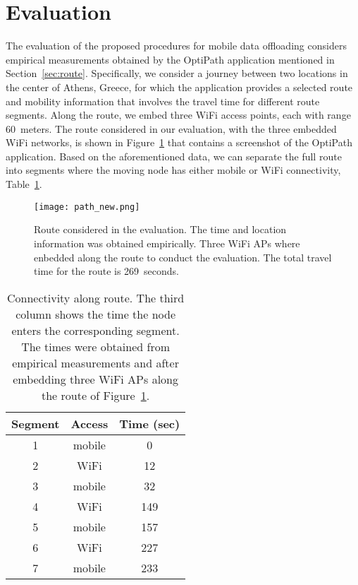 \documentclass{sig-alternate}
\newcommand{\mynotex}[1]{}
\begin{document}
\mynotex{
\begin{itemize}
\item Different with procedure in previous subsection is that we use maximum throughput of mobile.
\item Based on mobility prediction need to decide amount of data to cache in next WiFi hotspot and offset of data to cache from
\end{itemize}
}

\section {Evaluation}
\label{sec:evaluation}


The evaluation of the proposed procedures for mobile data offloading considers empirical measurements obtained by the OptiPath application mentioned in Section~\ref{sec:route}. Specifically, we consider a journey between two locations in the center of Athens, Greece, for which the application provides a selected route and mobility information that involves the travel time for different route segments.
Along the route, we embed three WiFi access points, each with range  60~meters. The route considered in our evaluation, with the three embedded  WiFi networks, is shown in Figure~\ref{fig:path} that contains a screenshot of the OptiPath application.
Based on the aforementioned data, we can separate the full route into segments where the moving node has either mobile  or WiFi connectivity, Table~\ref{tab:route_segments}.


\begin{figure}[t]
\centering
\texttt{[image: path\_new.png]}
\caption{\small{Route considered in the evaluation.
The time and location information was obtained empirically. Three WiFi APs where enbedded along the route to conduct the evaluation.
The total travel time for the route is 269~seconds.}}
\label{fig:path}
\end{figure}


\begin{table}[b]
\caption{Connectivity along route. The third column shows the time the node enters the corresponding segment. The times were obtained from empirical measurements and after embedding three WiFi APs  along the route of Figure~\ref{fig:path}.}
    \label{tab:route_segments}
\centering
 {\begin{tabular}{|c|c|c|}
        \hline
        Segment  &  Access &  Time (sec)\\
        \hline \hline
    1 & mobile & 0 \\
    2 & WiFi & 12 \\
    3 & mobile & 32 \\
    4 & WiFi & 149 \\
    5 & mobile & 157 \\
    6 & WiFi & 227 \\
    7 & mobile & 233 \\
        \hline
        \end{tabular}
}
\end{table}
\end{document}
